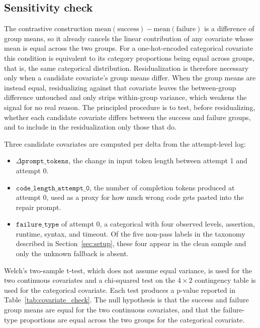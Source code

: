 \FloatBarrier
\subsection{Sensitivity check}
\label{subsec:sensitivity_check}

The contrastive construction $\mathrm{mean}(\text{success}) - \mathrm{mean}(\text{failure})$ is a difference of group means, so it already cancels the linear contribution of any covariate whose mean is equal across the two groups. 
For a one-hot-encoded categorical covariate this condition is equivalent to its category proportions being equal across groups, that is, the same categorical distribution. Residualization is therefore necessary only when a candidate covariate's group means differ.
When the group means are instead equal, residualizing against that covariate leaves the between-group difference untouched and only strips within-group variance, which weakens the signal for no real reason. The principled procedure is to test, before residualizing, whether each candidate covariate differs between the success and failure groups, and to include in the residualization only those that do.

Three candidate covariates are computed per delta from the attempt-level log:
\begin{itemize}
    \item $\Delta\texttt{prompt\_tokens}$, the change in input token length between attempt 1 and attempt 0.
    \item $\texttt{code\_length\_attempt\_0}$, the number of completion tokens produced at attempt 0, used as a proxy for how much wrong code gets pasted into the repair prompt.
    \item $\texttt{failure\_type}$ of attempt 0, a categorical with four observed levels, assertion, runtime, syntax, and timeout. Of the five non-pass labels in the taxonomy described in Section~\ref{sec:setup}, these four appear in the clean sample and only the unknown fallback is absent.
\end{itemize}

Welch's two-sample t-test, which does not assume equal variance, is used for the two continuous covariates and a chi-squared test on the $4 \times 2$ contingency table is used for the categorical covariate. Each test produces a p-value reported in Table~\ref{tab:covariate_check}. The null hypothesis is that the success and failure group means are equal for the two continuous covariates, and that the failure-type proportions are equal across the two groups for the categorical covariate.

